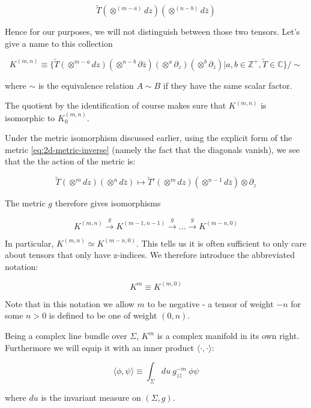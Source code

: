     \begin{equation}
        \tilde T(\otimes^{(m-a)} dz) (\otimes^{(n-b)} d\bar z)
    \end{equation}

    Hence for our purposes, we will not distinguish between those two tensors. Let's give a name to this collection

    \begin{defn}

        $$
        K^{(m, n)} \equiv \{ \tilde T(\otimes^{m-a} dz) (\otimes^{n-b} \partial \bar z) (\otimes^a \partial_z)
        (\otimes^b \partial_{\bar z}) | a,b \in \mathbb Z^+, \tilde T \in \mathbb C \} / \sim
        $$

        where $\sim$ is the equivalence relation $A \sim B$ if they have the same scalar factor.
    \end{defn}

    The quotient by the identification of course makes sure that $K^{(m, n)}$ is isomorphic to $K_0^{(m,n)}$.


    Under the metric isomorphism discussed earlier, using the explicit form of the metric \ref{eq:2d-metric-inverse} (namely the fact that the diagonals vanish), we see that the the action of the metric is:

    \begin{equation}
        \tilde T(\otimes^m dz) (\otimes^n d \bar z) \mapsto \tilde T'(\otimes^m dz)(\otimes^{n-1} d \bar z)\otimes \partial_z
    \end{equation}

    The metric $g$ therefore gives isomorphisms

    \begin{equation}
        K^{(m, n)} \xrightarrow{g} K^{(m-1, n-1)}  \xrightarrow{g} ... \xrightarrow{g}  K^{(m-n, 0)}
    \end{equation}

    In particular, $K^{(m, n)} \simeq K^{(m-n, 0)}$. This tells us it is often sufficient to only care about tensors that only have z-indices. We therefore introduce the abbreviated notation:

    \begin{equation}
        K^{m} \equiv K^{(m, 0)}
    \end{equation}

    Note that in this notation we allow $m$ to be negative - a tensor of weight $- n$ for some $n > 0 $ is defined to be one of weight $(0, n)$.

    Being a complex line bundle over $\Sigma$, $K^m$ is a complex manifold in its own right. Furthermore we will equip it with an inner product $ \langle \cdot{} , \cdot{} \rangle$:

    \begin{equation}
        \langle \phi , \psi \rangle \equiv \int_\Sigma du ~g_{z \bar z}^{-m}~ \phi \psi
    \end{equation}

    where $du$ is the invariant measure on $(\Sigma, g)$.